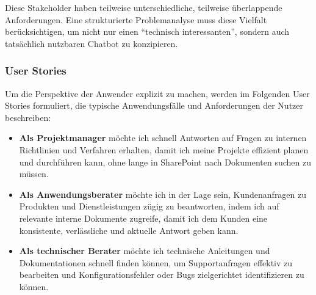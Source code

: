 Diese Stakeholder haben teilweise unterschiedliche, teilweise überlappende Anforderungen.
Eine strukturierte Problemanalyse muss diese Vielfalt berücksichtigen, um nicht nur einen \enquote{technisch interessanten}, sondern auch tatsächlich nutzbaren Chatbot zu konzipieren.

\subsubsection{User Stories}\label{subsec:user-stories}

Um die Perspektive der Anwender explizit zu machen, werden im Folgenden User Stories formuliert, die typische Anwendungsfälle und Anforderungen der Nutzer beschreiben:

\begin{itemize}
    \item \textbf{Als Projektmanager} möchte ich schnell Antworten auf Fragen zu internen Richtlinien und Verfahren erhalten, damit ich meine Projekte effizient planen und durchführen kann, ohne lange in SharePoint nach Dokumenten suchen zu müssen.

    \item \textbf{Als Anwendungsberater} möchte ich in der Lage sein, Kundenanfragen zu Produkten und Dienstleistungen zügig zu beantworten, indem ich auf relevante interne Dokumente zugreife, damit ich dem Kunden eine konsistente, verlässliche und aktuelle Antwort geben kann.

    \item \textbf{Als technischer Berater} möchte ich technische Anleitungen und Dokumentationen schnell finden können, um Supportanfragen effektiv zu bearbeiten und Konfigurationsfehler oder Bugs zielgerichtet identifizieren zu können.
\end{itemize}

